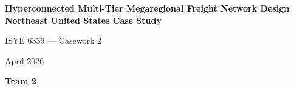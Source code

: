 \documentclass[11pt, letterpaper]{article}
\begin{document}
\begin{titlepage}
  \centering
  \vspace*{2cm}
  {\LARGE\bfseries Hyperconnected Multi-Tier Megaregional Freight Network Design\\[0.4em]
  Northeast United States Case Study\par}
  \vspace{1.5cm}
  {\large ISYE 6339 — Casework 2\par}
  \vspace{0.5cm}
  {\large April 2026\par}
  \vspace{3cm}
  {\normalsize\textbf{Team 2}}
  \vfill
\end{titlepage}

\tableofcontents
\clearpage















\end{document}
